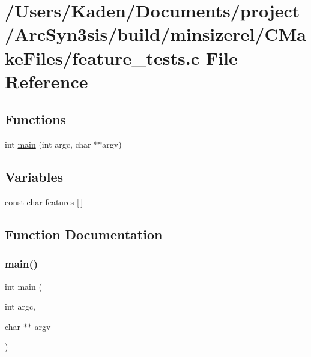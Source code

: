 \hypertarget{a00810}{}\section{/\+Users/\+Kaden/\+Documents/project/\+Arc\+Syn3sis/build/minsizerel/\+C\+Make\+Files/feature\+\_\+tests.c File Reference}
\label{a00810}
\subsection*{Functions}
\begin{DoxyCompactItemize}
\item 
int \hyperlink{a00810_a3c04138a5bfe5d72780bb7e82a18e627}{main} (int argc, char $\ast$$\ast$argv)
\end{DoxyCompactItemize}
\subsection*{Variables}
\begin{DoxyCompactItemize}
\item 
const char \hyperlink{a00810_a1582568e32f689337602a16bf8a5bff0}{features} \mbox{[}$\,$\mbox{]}
\end{DoxyCompactItemize}


\subsection{Function Documentation}
\mbox{\label{a00810_a3c04138a5bfe5d72780bb7e82a18e627}} 
\subsubsection{\texorpdfstring{main()}{main()}}
{\footnotesize\ttfamily int main (\begin{DoxyParamCaption}\item[{int}]{argc,  }\item[{char $\ast$$\ast$}]{argv }\end{DoxyParamCaption})}




